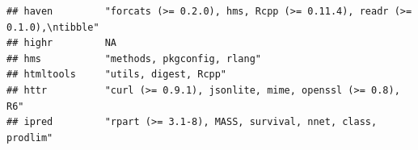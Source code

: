 \documentclass[]{article}
\begin{document}
\begin{verbatim}
## haven         "forcats (>= 0.2.0), hms, Rcpp (>= 0.11.4), readr (>= 0.1.0),\ntibble"                                                                                                                                                                                                                                                                                                                                                                                                                
## highr         NA                                                                                                                                                                                                                                                                                                                                                                                                                                                                                    
## hms           "methods, pkgconfig, rlang"                                                                                                                                                                                                                                                                                                                                                                                                                                                           
## htmltools     "utils, digest, Rcpp"                                                                                                                                                                                                                                                                                                                                                                                                                                                                 
## httr          "curl (>= 0.9.1), jsonlite, mime, openssl (>= 0.8), R6"                                                                                                                                                                                                                                                                                                                                                                                                                               
## ipred         "rpart (>= 3.1-8), MASS, survival, nnet, class, prodlim"                                                                                                                                                                                                                                                                                                                                                                                                                              

\end{verbatim}
\end{document}
